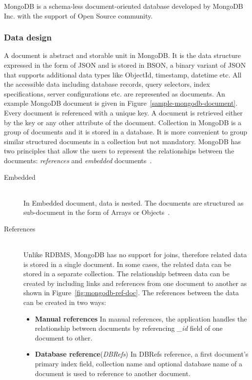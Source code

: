 MongoDB is a schema-less document-oriented database developed by MongoDB Inc. with the support of Open Source community. 
\subsubsection{Data design} 
	A document is abstract and storable unit in MongoDB. It is the data structure expressed in the form of JSON and is stored in BSON, a binary variant of JSON that supports additional data types like ObjectId, timestamp, datetime etc. All the accessible data including database records, query selectors, index specifications, server configurations etc. are represented as documents. An example  MongoDB document is given in Figure~\ref{sample-mongodb-document}.
Every document is referenced with a unique key. A document is retrieved either by the key or any other attribute of the document. Collection in MongoDB is a group of documents and it is stored in a database. It is more convenient to group similar structured documents in a collection but not mandatory. MongoDB has two principles that allow the users to represent the relationships between the documents: \textit{references} and \textit{embedded} documents~\citep{mongodb:org}. 
\begin{description}
\item[Embedded]\label{mongo:embedded} \hfill \\
    In Embedded document, data is nested. The documents are structured as sub-document in the form of Arrays or Objects~\citep{nosql/comparision}. 
    \item[References] \hfill \\
    Unlike RDBMS, MongoDB has no support for joins, therefore related data is stored in a single document. In some cases, the related data can be stored in a separate collection. The relationship between data can be created by including links and references from one document to another as shown in Figure~\ref{fig:mongodb-ref-doc}.  The references between the data can be created in two ways:
\begin{itemize}
	\item {\textbf{Manual references}}
		In manual references, the application handles the relationship between documents by referencing \textit{\_id} field of one document to other. 
	\item \textbf{Database reference}(\textit{DBRefs})
	In  DBRefs reference, a first document's primary index field, collection name and optional database name of a document is used to reference to another document.
\end{itemize}



\end{description}

